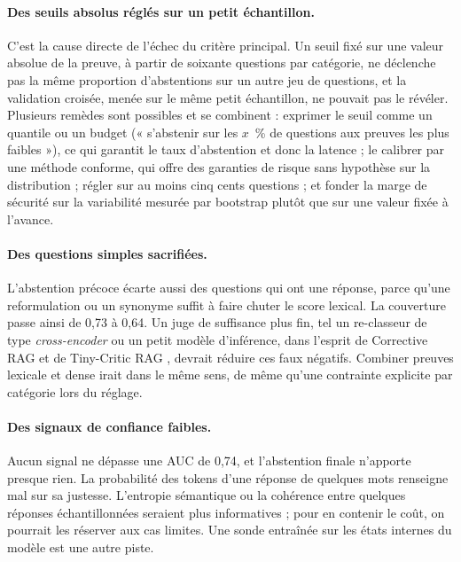 \documentclass[11pt,a4paper]{article}
\begin{document}
\paragraph{Des seuils absolus réglés sur un petit échantillon.} C'est la cause directe de l'échec du
critère principal. Un seuil fixé sur une valeur absolue de la preuve, à partir de soixante questions par
catégorie, ne déclenche pas la même proportion d'abstentions sur un autre jeu de questions, et la
validation croisée, menée sur le même petit échantillon, ne pouvait pas le révéler. Plusieurs remèdes
sont possibles et se combinent : exprimer le seuil comme un quantile ou un budget (« s'abstenir sur les
$x$~\% de questions aux preuves les plus faibles »), ce qui garantit le taux d'abstention et donc la
latence ; le calibrer par une méthode conforme, qui offre des garanties de risque sans hypothèse sur la
distribution \citep{hao2026racer} ; régler sur au moins cinq cents questions ; et fonder la marge de
sécurité sur la variabilité mesurée par bootstrap plutôt que sur une valeur fixée à l'avance.

\paragraph{Des questions simples sacrifiées.} L'abstention précoce écarte aussi des questions qui ont
une réponse, parce qu'une reformulation ou un synonyme suffit à faire chuter le score lexical. La
couverture passe ainsi de 0,73 à 0,64. Un juge de suffisance plus fin, tel un re-classeur de type
\emph{cross-encoder} ou un petit modèle d'inférence, dans l'esprit de Corrective RAG
\citep{yan2024crag} et de Tiny-Critic RAG \citep{wu2026tinycritic}, devrait réduire ces faux négatifs.
Combiner preuves lexicale et dense irait dans le même sens, de même qu'une contrainte explicite par
catégorie lors du réglage.

\paragraph{Des signaux de confiance faibles.} Aucun signal ne dépasse une AUC de 0,74, et l'abstention
finale n'apporte presque rien. La probabilité des tokens d'une réponse de quelques mots renseigne mal sur
sa justesse. L'entropie sémantique \citep{kuhn2023semantic} ou la cohérence entre quelques réponses
échantillonnées seraient plus informatives ; pour en contenir le coût, on pourrait les réserver aux cas
limites. Une sonde entraînée sur les états internes du modèle \citep{kadavath2022know} est une autre
piste.
\end{document}

